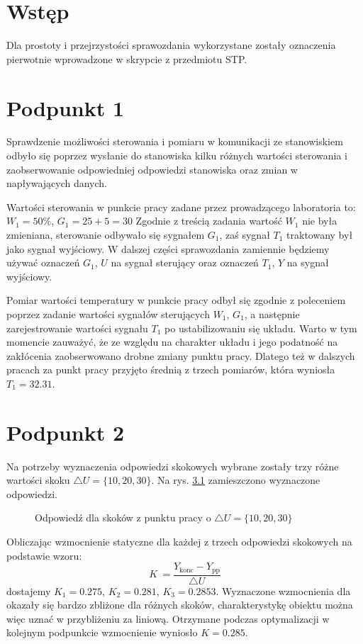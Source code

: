 \chapter{Wstęp}
Dla prostoty i przejrzystości sprawozdania wykorzystane zostały oznaczenia pierwotnie wprowadzone w skrypcie z przedmiotu STP.

\chapter{Podpunkt 1}
Sprawdzenie możliwości sterowania i pomiaru w komunikacji ze stanowiskiem odbyło się poprzez wysłanie do stanowiska kilku różnych wartości sterowania i zaobserwowanie odpowiedniej odpowiedzi stanowiska oraz zmian w napływających danych.

Wartości sterowania w punkcie pracy zadane przez prowadzącego laboratoria to: $W_1=50\%$, $G_1=25+5=30$ Zgodnie z treścią zadania wartość $W_1$ nie była zmieniana, sterowanie odbywało się sygnałem $G_1$, zaś sygnał $T_1$ traktowany był jako sygnał wyjściowy. W dalszej części sprawozdania zamiennie będziemy używać oznaczeń $G_1$, $U$ na sygnał sterujący oraz oznaczeń $T_1$, $Y$ na sygnał wyjściowy.

Pomiar wartości temperatury w punkcie pracy odbył się zgodnie z poleceniem poprzez zadanie wartości sygnałów sterujących $W_1$, $G_1$, a następnie zarejestrowanie wartości sygnału $T_1$ po ustabilizowaniu się układu. Warto w tym momencie zauważyć, że ze względu na charakter układu i jego podatność na zakłócenia zaobserwowano drobne zmiany punktu pracy. Dlatego też w dalszych pracach za punkt pracy przyjęto średnią z trzech pomiarów, która wyniosła $T_1=\num{32,31}$.


\chapter{Podpunkt 2}
Na potrzeby wyznaczenia odpowiedzi skokowych wybrane zostały trzy różne wartości skoku $\triangle U = \{10, 20, 30\}$. Na rys. \ref{R1} zamieszczono wyznaczone odpowiedzi.

\begin{figure}[ht]
\centering

\caption{Odpowiedź dla skoków z punktu pracy o $\triangle U = \{10, 20, 30\}$}
\label{R1}
\end{figure}

Obliczając wzmocnienie statyczne dla każdej z trzech odpowiedzi skokowych na podstawie wzoru:
\begin{equation}
 K~=\frac{Y_{\mathrm{konc}}-Y_{\mathrm{pp}}}{\triangle U}
 \end{equation}
dostajemy $K_1=\num{0,275}$, $K_2=\num{0,281}$, $K_3=\num{0,2853}$. Wyznaczone wzmocnienia dla okazały się bardzo zbliżone dla różnych skoków, charakterystykę obiektu można więc uznać w przybliżeniu za liniową. Otrzymane podczas optymalizacji w kolejnym podpunkcie wzmocnienie wyniosło $K=\num{0,285}$.


